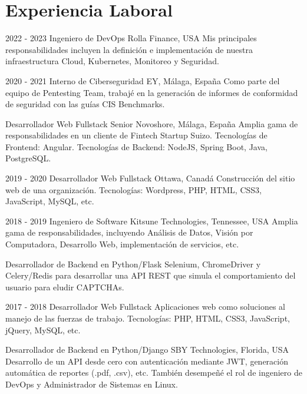 \documentclass[]{friggeri-cv}
\begin{document}
\section{Experiencia Laboral}
\begin{entrylist}
  \entry
    {2022 - 2023}
    {Ingeniero de DevOps}
    {Rolla Finance, USA}
    {Mis principales responsabilidades incluyen la definición e implementación de nuestra infraestructura Cloud, Kubernetes, Monitoreo y Seguridad.\\}

  \entry
    {2020 - 2021}
    {Interno de Ciberseguridad}
    {EY, Málaga, España}
    {Como parte del equipo de Pentesting Team, trabajé en la generación de informes de conformidad de seguridad con las guías CIS Benchmarks.\\}

  \entry
    {}
    {Desarrollador Web Fullstack Senior}
    {Novoshore, Málaga, España}
    {Amplia gama de responsabilidades en un cliente de Fintech Startup Suizo. Tecnologías de Frontend: Angular. Tecnologías de Backend: NodeJS, Spring Boot, Java, PostgreSQL.\\}

  \entry
    {2019 - 2020}
    {Desarrollador Web Fullstack}
    {Ottawa, Canadá} %
    {Construcción del sitio web de una organización. Tecnologías: Wordpress, PHP, HTML, CSS3, JavaScript, MySQL, etc.\\}

  \entry
    {2018 - 2019}
    {Ingeniero de Software}
    {Kitsune Technologies, Tennessee, USA}
    {Amplia gama de responsabilidades, incluyendo Análisis de Datos, Visión por Computadora, Desarrollo Web, implementación de servicios, etc.\\}

  \entry
    {}
    {Desarrollador de Backend en Python/Flask}
    {} 
    {Selenium, ChromeDriver y Celery/Redis para desarrollar una API REST que simula el comportamiento del usuario para eludir CAPTCHAs.\\}

  \entry
    {2017 - 2018}
    {Desarrollador Web Fullstack}
    {}
    {Aplicaciones web como soluciones al manejo de las fuerzas de trabajo. Tecnologías: PHP, HTML, CSS3, JavaScript, jQuery, MySQL, etc.\\}

  \entry
    {}
    {Desarrollador de Backend en Python/Django}
    {SBY Technologies, Florida, USA}
    {Desarrollo de un API desde cero con autenticación mediante JWT, generación automática de reportes (.pdf, .csv), etc. También desempeñé el rol de ingeniero de DevOps y Administrador de Sistemas en Linux.\\}
    

\end{entrylist}
\end{document}
